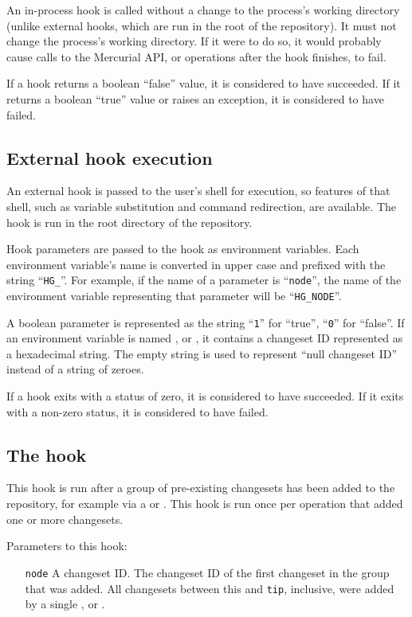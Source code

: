 An in-process hook is called without a change to the process's working
directory (unlike external hooks, which are run in the root of the
repository).  It must not change the process's working directory.  If
it were to do so, it would probably cause calls to the Mercurial API,
or operations after the hook finishes, to fail.

If a hook returns a boolean ``false'' value, it is considered to
have succeeded.  If it returns a boolean ``true'' value or raises an
exception, it is considered to have failed.

\subsection{External hook execution}

An external hook is passed to the user's shell for execution, so
features of that shell, such as variable substitution and command
redirection, are available.  The hook is run in the root directory of
the repository.

Hook parameters are passed to the hook as environment variables.  Each
environment variable's name is converted in upper case and prefixed
with the string ``\texttt{HG\_}''.  For example, if the name of a
parameter is ``\texttt{node}'', the name of the environment variable
representing that parameter will be ``\texttt{HG\_NODE}''.

A boolean parameter is represented as the string ``\texttt{1}'' for
``true'', ``\texttt{0}'' for ``false''.  If an environment variable is
named ,  or , it
contains a changeset ID represented as a hexadecimal string.  The
empty string is used to represent ``null changeset ID'' instead of a
string of zeroes.

If a hook exits with a status of zero, it is considered to have
succeeded.  If it exits with a non-zero status, it is considered to
have failed.

\subsection{The  hook}
\label{sec:hook:changegroup}

This hook is run after a group of pre-existing changesets has been
added to the repository, for example via a  or
.  This hook is run once per operation that added one
or more changesets.

Parameters to this hook:
\begin{itemize}
\item[\texttt{node}] A changeset ID.  The changeset ID of the first
  changeset in the group that was added.  All changesets between this
  and \texttt{tip}, inclusive, were added by
  a single ,  or .
\end{itemize}

